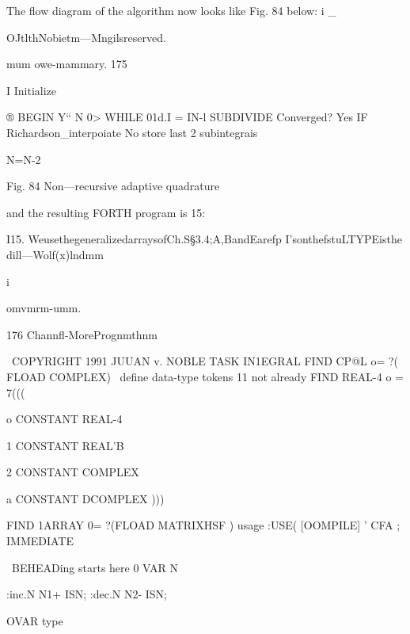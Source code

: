 The flow diagram of the algorithm now looks like Fig. 84 below: i _

OJtlthNobietm—Mngilsreserved.

 

mum owe-mammary. 175

 

I Initialize

 

® BEGIN
Y“ N 0>
WHILE
01d.I = IN-l
SUBDIVIDE Converged?
Yes
IF Richardson_interpoiate
No store last 2 subintegrais

N=N-2

 

 

 

 

 

 

Fig. 84 Non—recursive adaptive quadrature

and the resulting FORTH program is 15:

I15. WeusethegeneralizedarraysofCh.S§3.4;A,BandEarefp I'sonthefstuLTYPEisthe
dill—Wolf(x)lndmm

 

i

omvmrm-umm.

176 Channﬂ-MorePrognmthnm

\ COPYRIGHT 1991 JUUAN v. NOBLE
TASK IN1EGRAL
FIND CP@L o= ?( FLOAD COMPLEX)
\ deﬁne data-type tokens 11 not already
FIND REAL-4 o = 7(((

o CONSTANT REAL-4

1 CONSTANT REAL'B

2 CONSTANT COMPLEX

a CONSTANT DCOMPLEX )))

FIND 1ARRAY 0= ?(FLOAD MATRIXHSF )
\function usage
:USE( [OOMPILE] ' CFA ; IMMEDIATE

\ BEHEADing starts here
0 VAR N

:inc.N N1+ ISN;
:dec.N N2- ISN;

OVAR type

